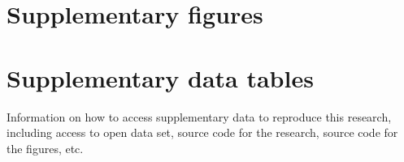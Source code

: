 \documentclass[
  manuscript=article,  %
  layout=preprint,  %
  year=20xx,
  volume=x,
]{extra/joas}
\begin{document}
\begin{acknowledgement}
\blindtext
\end{acknowledgement}


\printbibliography

\appendix

\section{Supplementary figures}
\blindtext

\section{Supplementary data tables}
\blindtext

\begin{reproduce}
Information on how to access supplementary data to reproduce this research, including access to open data set, source code for the research, source code for the figures, etc.
\end{reproduce}
\end{document}
